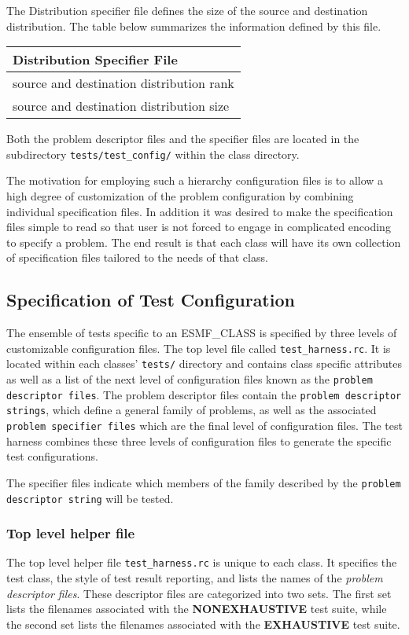 The Distribution specifier file defines the size of the source and destination distribution. The table below summarizes the information defined by this file. 
\begin{center}
\begin{tabular}{|l|} \hline
Distribution Specifier File \\
\hline \hline
source and destination distribution rank \\
source and destination distribution size \\
\hline
\end{tabular}
\end{center}
 Both the problem descriptor files and the specifier files are located in the subdirectory \texttt{tests/test\_config/} within the class directory.

The motivation for employing such a hierarchy configuration files is to allow a high degree of customization of the problem configuration by combining individual specification files. In addition it was desired to make the specification files simple to read so that user is not forced to engage in complicated encoding to specify a problem. The end result is that each class will have its own collection of specification files tailored to the needs of that class.

\subsection{Specification of Test Configuration}
The ensemble of tests specific to an {ESMF\_CLASS} is specified by three levels of customizable configuration files. The top level file called \texttt{test\_harness.rc}. It is located within each classes' \texttt{tests/} directory and contains class specific attributes as well as a list of the next level of configuration files known as the \texttt{problem descriptor files}. The problem descriptor files contain the \texttt{problem descriptor strings}, which define a general family of problems, as well as the associated \texttt{problem specifier files} which are the final level of configuration files. The test harness combines these three levels of configuration files to generate the specific test configurations. 

The specifier files indicate which members of the family described by the \texttt{problem descriptor string} will be tested. 
 
\subsubsection{Top level helper file}
\label{sec:harness_toplevelfile}
The top level helper file \texttt{test\_harness.rc} is unique to each class. It specifies the test class, the style of test result reporting, and lists the names of the \textit{problem descriptor files}. These descriptor files are categorized into two sets. The first set lists the filenames associated with the \textbf{NONEXHAUSTIVE} test suite, while the second set lists the filenames associated with the \textbf{EXHAUSTIVE} test suite. 

